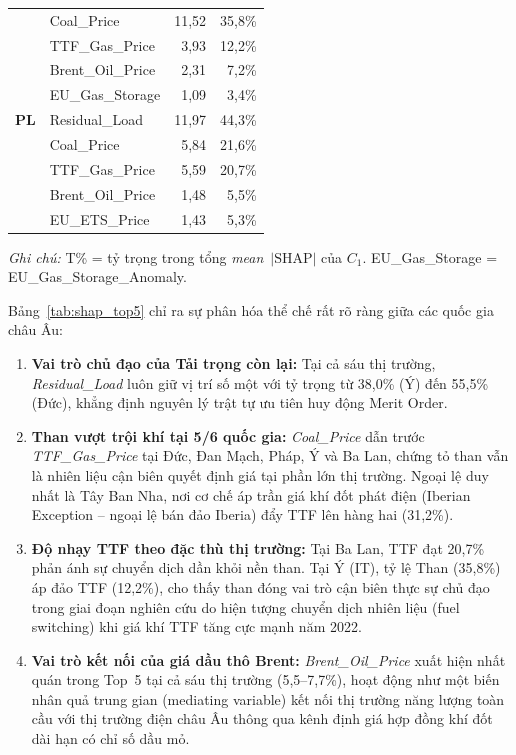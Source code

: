 \begin{table}[h!]
\begin{tabular*}{\columnwidth}{@{\extracolsep{\fill}}llrr@{}}
                & Coal\_Price        & 11,52 & 35,8\% \\
                & TTF\_Gas\_Price    &  3,93 & 12,2\% \\
                & Brent\_Oil\_Price  &  2,31 &  7,2\% \\
                & EU\_Gas\_Storage   &  1,09 &  3,4\% \\
    \midrule
    \textbf{PL} & Residual\_Load     & 11,97 & 44,3\% \\
                & Coal\_Price        &  5,84 & 21,6\% \\
                & TTF\_Gas\_Price    &  5,59 & 20,7\% \\
                & Brent\_Oil\_Price  &  1,48 &  5,5\% \\
                & EU\_ETS\_Price     &  1,43 &  5,3\% \\
    \bottomrule
  \end{tabular*}
  \vspace{0.1cm}
  \begin{minipage}{\columnwidth}
    \footnotesize \textit{Ghi chú:} T\% = tỷ trọng trong tổng \textit{mean}~$|\text{SHAP}|$ của $C_1$. EU\_Gas\_Storage = EU\_Gas\_Storage\_Anomaly.
  \end{minipage}
\end{table}

Bảng~\ref{tab:shap_top5} chỉ ra sự phân hóa thể chế rất rõ ràng giữa các quốc gia châu Âu:
\begin{enumerate}
  \item \textbf{Vai trò chủ đạo của Tải trọng còn lại:} Tại cả sáu thị trường, \textit{Residual\_Load} luôn giữ vị trí số một với tỷ trọng từ 38,0\% (Ý) đến 55,5\% (Đức), khẳng định nguyên lý trật tự ưu tiên huy động Merit Order.
  \item \textbf{Than vượt trội khí tại 5/6 quốc gia:} \textit{Coal\_Price} dẫn trước \textit{TTF\_Gas\_Price} tại Đức, Đan Mạch, Pháp, Ý và Ba Lan, chứng tỏ than vẫn là nhiên liệu cận biên quyết định giá tại phần lớn thị trường. Ngoại lệ duy nhất là Tây Ban Nha, nơi cơ chế áp trần giá khí đốt phát điện (Iberian Exception -- ngoại lệ bán đảo Iberia) đẩy TTF lên hàng hai (31,2\%).
  \item \textbf{Độ nhạy TTF theo đặc thù thị trường:} Tại Ba Lan, TTF đạt 20,7\% phản ánh sự chuyển dịch dần khỏi nền than. Tại Ý (IT), tỷ lệ Than (35,8\%) áp đảo TTF (12,2\%), cho thấy than đóng vai trò cận biên thực sự chủ đạo trong giai đoạn nghiên cứu do hiện tượng chuyển dịch nhiên liệu (fuel switching) khi giá khí TTF tăng cực mạnh năm 2022.
  \item \textbf{Vai trò kết nối của giá dầu thô Brent:} \textit{Brent\_Oil\_Price} xuất hiện nhất quán trong Top~5 tại cả sáu thị trường (5,5--7,7\%), hoạt động như một biến nhân quả trung gian (mediating variable) kết nối thị trường năng lượng toàn cầu với thị trường điện châu Âu thông qua kênh định giá hợp đồng khí đốt dài hạn có chỉ số dầu mỏ.
\end{enumerate}

